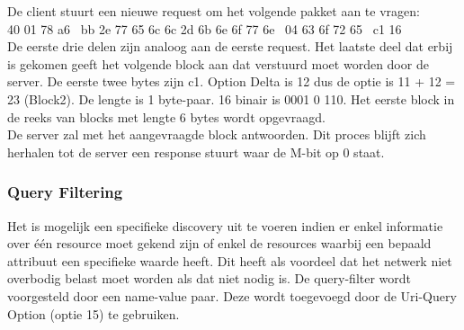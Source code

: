 \noindent
De client stuurt een nieuwe request om het volgende pakket aan te vragen:\\
40 01 78 a6 \textbar~bb 2e 77 65 6c 6c 2d 6b 6e 6f 77 6e \textbar~04 63 6f 72 65 \textbar~c1 16\\
De eerste drie delen zijn analoog aan de eerste request. Het laatste deel dat erbij is gekomen geeft het volgende block aan dat verstuurd moet worden door de server. De eerste twee bytes zijn c1. Option Delta is 12 dus de optie is 11 + 12 = 23 (Block2). De lengte is 1 byte-paar. 16 binair is 0001 0 110. Het eerste block in de reeks van blocks met lengte 6 bytes wordt opgevraagd.\\

\noindent
De server zal met het aangevraagde block antwoorden. Dit proces blijft zich herhalen tot de server een response stuurt waar de M-bit op 0 staat.

\subsubsection{Query Filtering}
Het is mogelijk een specifieke discovery uit te voeren indien er enkel informatie over één resource moet gekend zijn of enkel de resources waarbij een bepaald attribuut een specifieke waarde heeft. Dit heeft als voordeel dat het netwerk niet overbodig belast moet worden als dat niet nodig is. De query-filter wordt voorgesteld door een name-value paar. Deze wordt toegevoegd door de Uri-Query Option (optie 15) te gebruiken.

